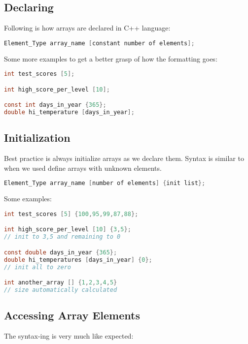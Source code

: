 \subsection{Declaring}
Following is how arrays are declared in C++ language: 
\begin{mdframed}
\begin{lstlisting}[language=c]
Element_Type array_name [constant number of elements];
\end{lstlisting}
\end{mdframed}
Some more examples to get a better grasp of how the formatting goes:
\begin{mdframed}
\begin{lstlisting}[language=c]
int test_scores [5];

int high_score_per_level [10];

const int days_in_year {365};
double hi_temperature [days_in_year];

\end{lstlisting}
\end{mdframed}

\subsection{Initialization}
Best practice is always initialize arrays as we declare them. Syntax is similar to when we used define arrays with unknown elements. 
\begin{mdframed}
\begin{lstlisting}[language=c]
Element_Type array_name [number of elements] {init list};
\end{lstlisting}
\end{mdframed}
Some examples:
\begin{mdframed}
\begin{lstlisting}[language=c]
int test_scores [5] {100,95,99,87,88};

int high_score_per_level [10] {3,5};
// init to 3,5 and remaining to 0

const double days_in_year {365};
double hi_temperatures [days_in_year] {0};
// init all to zero

int another_array [] {1,2,3,4,5}
// size automatically calculated
\end{lstlisting}
\end{mdframed}

\subsection{Accessing Array Elements}
The syntax-ing is very much like expected:

